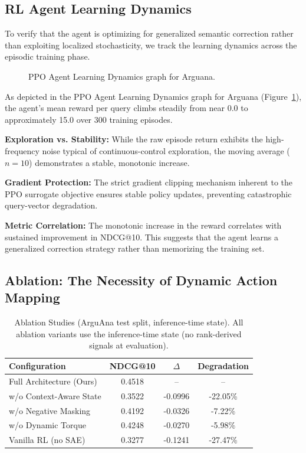\documentclass[sigconf]{acmart}
\begin{document}
\subsection{RL Agent Learning Dynamics}

To verify that the agent is optimizing for generalized semantic correction rather than exploiting localized stochasticity, we track the learning dynamics across the episodic training phase.

\begin{figure}[t]
  \centering
  \caption{PPO Agent Learning Dynamics graph for Arguana.}
  \label{fig:learning}
\end{figure}

As depicted in the PPO Agent Learning Dynamics graph for Arguana (Figure~\ref{fig:learning}), the agent's mean reward per query climbs steadily from near 0.0 to approximately 15.0 over 300 training episodes.

\textbf{Exploration vs. Stability:} While the raw episode return exhibits the high-frequency noise typical of continuous-control exploration, the moving average ($n=10$) demonstrates a stable, monotonic increase.

\textbf{Gradient Protection:} The strict gradient clipping mechanism inherent to the PPO surrogate objective ensures stable policy updates, preventing catastrophic query-vector degradation.

\textbf{Metric Correlation:} The monotonic increase in the reward correlates with sustained improvement in NDCG@10. This suggests that the agent learns a generalized correction strategy rather than memorizing the training set.

\subsection{Ablation: The Necessity of Dynamic Action Mapping}

\begin{table}[t]
  \caption{Ablation Studies (ArguAna test split, inference-time state). All ablation variants use the inference-time state (no rank-derived signals at evaluation).}
  \label{tab:ablation}
  \begin{tabular}{lccc}
    \toprule
    Configuration & NDCG@10 & $\Delta$ & Degradation\\
    \midrule
    Full Architecture (Ours) & 0.4518 & -- & --\\
    w/o Context-Aware State & 0.3522 & -0.0996 & -22.05\%\\
    w/o Negative Masking & 0.4192 & -0.0326 & -7.22\%\\
    w/o Dynamic Torque & 0.4248 & -0.0270 & -5.98\%\\
    Vanilla RL (no SAE) & 0.3277 & -0.1241 & -27.47\%\\
    \bottomrule
  \end{tabular}
\end{table}
\end{document}

